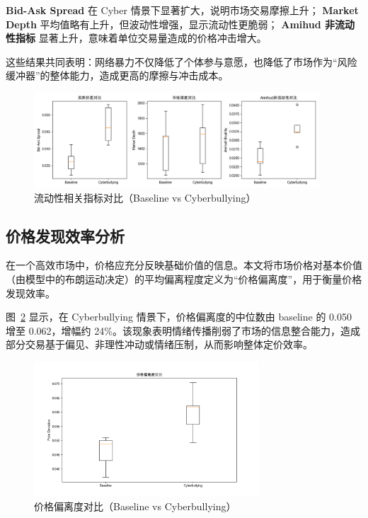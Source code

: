     \textbf{Bid-Ask Spread} 在 Cyber 情景下显著扩大，说明市场交易摩擦上升；
    \textbf{Market Depth} 平均值略有上升，但波动性增强，显示流动性更脆弱；
    \textbf{Amihud 非流动性指标} 显著上升，意味着单位交易量造成的价格冲击增大。
    
    这些结果共同表明：网络暴力不仅降低了个体参与意愿，也降低了市场作为“风险缓冲器”的整体能力，造成更高的摩擦与冲击成本。
    
    \begin{figure}[htbp]
        \centering
        \includegraphics[width=0.95\textwidth]{image/fig4_9_liquidity_metrics_comparison.png}
        \caption{流动性相关指标对比（Baseline vs Cyberbullying）}
        \label{fig:liquidity_metrics_comparison}
    \end{figure}
    
    \subsection{价格发现效率分析}
    
    在一个高效市场中，价格应充分反映基础价值的信息。本文将市场价格对基本价值（由模型中的布朗运动决定）的平均偏离程度定义为“价格偏离度”，用于衡量价格发现效率。
    
    图~\ref{fig:price_deviation_comparison} 显示，在 Cyberbullying 情景下，价格偏离度的中位数由 baseline 的 0.050 增至 0.062，增幅约 24\%。该现象表明情绪传播削弱了市场的信息整合能力，造成部分交易基于偏见、非理性冲动或情绪压制，从而影响整体定价效率。
    
    \begin{figure}[htbp]
        \centering
        \includegraphics[width=0.75\textwidth]{image/fig4_10_price_deviation_comparison.png}
        \caption{价格偏离度对比（Baseline vs Cyberbullying）}
        \label{fig:price_deviation_comparison}
    \end{figure}
    
